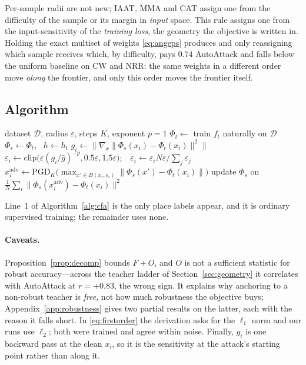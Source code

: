 Per-sample radii are not new; IAAT, MMA and CAT assign one from the difficulty of the sample or its
margin in \emph{input} space. This rule assigns one from the input-sensitivity of the \emph{training
loss}, the geometry the objective is written in. Holding the exact multiset of weights
\eqref{eq:angeps} produces and only reassigning which sample receives which, by difficulty, pays
$0.74$ AutoAttack and falls below the uniform baseline on CW and NRR: the same weights in a different
order move \emph{along} the frontier, and only this order moves the frontier itself.

\subsection{Algorithm}

\begin{algorithm}[t]
\caption{Clean Feature Anchoring (CFA)}
\label{alg:cfa}
\begin{algorithmic}[1]
\Require dataset $\mathcal{D}$, radius $\varepsilon$, steps $K$, exponent $p=1$
\State $\Phi_t \gets$ train $f_t$ naturally on $\mathcal{D}$
\State $\Phi_s \gets \Phi_t$, \ $h \gets h_t$ 
  \State $g_i \gets \big\lVert\nabla_x\lVert\Phi_s(x_i)-\Phi_t(x_i)\rVert^2\big\rVert$
  \State $\varepsilon_i \gets \mathrm{clip}\big(\varepsilon(g_i/\bar g)^{-p},
    0.5\varepsilon, 1.5\varepsilon\big)$;\ \
    $\varepsilon_i \gets \varepsilon_i N\varepsilon/\sum_j\varepsilon_j$
    \Comment{budget preserved}
  \State $x_i^{\mathrm{adv}} \gets \mathrm{PGD}_K\big(\max_{x'\in B(x_i,\varepsilon_i)}
    \lVert\Phi_s(x')-\Phi_t(x_i)\rVert\big)$
  \State update $\Phi_s$ on
    $\frac{1}{N}\sum_i\lVert\Phi_s(x_i^{\mathrm{adv}})-\Phi_t(x_i)\rVert^2$
    \Comment{$h$ is never updated}
\EndFor
\end{algorithmic}
\end{algorithm}

Line~1 of Algorithm~\ref{alg:cfa} is the only place labels appear, and it is ordinary supervised
training; the remainder uses none.

\paragraph{Caveats.} Proposition~\ref{prop:decomp} bounds $F+O$, and $O$ is not a sufficient statistic
for robust accuracy---across the teacher ladder of Section~\ref{sec:geometry} it correlates with
AutoAttack at $r=+0.83$, the wrong sign. It explains why anchoring to a non-robust teacher is
\emph{free}, not how much robustness the objective buys; Appendix~\ref{app:robustness} gives two
partial results on the latter, each with the reason it falls short. In \eqref{eq:firstorder} the
derivation asks for the $\ell_1$ norm and our runs use $\ell_2$; both were trained and agree within
noise. Finally, $g_i$ is one backward pass at the clean $x_i$, so it is the sensitivity at the
attack's starting point rather than along it.
